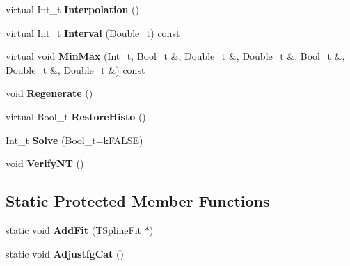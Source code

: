 \begin{DoxyCompactItemize}
\item 
\hypertarget{classTSplineFit_a0ab47b5bc63307de9831aaf0923e2867}{
virtual Int\_\-t {\bfseries Interpolation} ()}
\label{classTSplineFit_a0ab47b5bc63307de9831aaf0923e2867}

\item 
\hypertarget{classTSplineFit_a225e0e00bf8600ce87e43556398a83db}{
virtual Int\_\-t {\bfseries Interval} (Double\_\-t) const }
\label{classTSplineFit_a225e0e00bf8600ce87e43556398a83db}

\item 
\hypertarget{classTSplineFit_a2f8fb35341ba411cf350425365910161}{
virtual void {\bfseries MinMax} (Int\_\-t, Bool\_\-t \&, Double\_\-t \&, Double\_\-t \&, Bool\_\-t \&, Double\_\-t \&, Double\_\-t \&) const }
\label{classTSplineFit_a2f8fb35341ba411cf350425365910161}

\item 
\hypertarget{classTSplineFit_a3ddcae27148502859d3ab79ef05c2c4e}{
void {\bfseries Regenerate} ()}
\label{classTSplineFit_a3ddcae27148502859d3ab79ef05c2c4e}

\item 
\hypertarget{classTSplineFit_a91c3fdb511835006a016a465cf1f46c3}{
virtual Bool\_\-t {\bfseries RestoreHisto} ()}
\label{classTSplineFit_a91c3fdb511835006a016a465cf1f46c3}

\item 
\hypertarget{classTSplineFit_a1f62f0b369cc0f0e04b3b0e590fe56ec}{
Int\_\-t {\bfseries Solve} (Bool\_\-t=kFALSE)}
\label{classTSplineFit_a1f62f0b369cc0f0e04b3b0e590fe56ec}

\item 
\hypertarget{classTSplineFit_aa2975f780cc629ba30dd5511c53fdb98}{
void {\bfseries VerifyNT} ()}
\label{classTSplineFit_aa2975f780cc629ba30dd5511c53fdb98}

\end{DoxyCompactItemize}
\subsection*{Static Protected Member Functions}
\begin{DoxyCompactItemize}
\item 
\hypertarget{classTSplineFit_a917d6ec70911edd89a553156f575cec5}{
static void {\bfseries AddFit} (\hyperlink{classTSplineFit}{TSplineFit} $\ast$)}
\label{classTSplineFit_a917d6ec70911edd89a553156f575cec5}

\item 
\hypertarget{classTSplineFit_aff26e68d0b5782178b89228dd30b918e}{
static void {\bfseries AdjustfgCat} ()}
\label{classTSplineFit_aff26e68d0b5782178b89228dd30b918e}

\end{DoxyCompactItemize}
